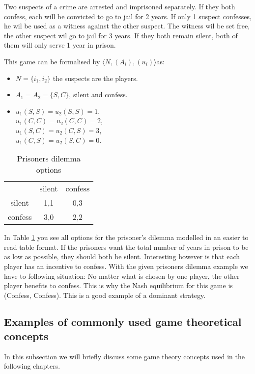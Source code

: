 Two suspects of a crime are arrested and imprisoned separately. If they both confess, each will be convicted to go to jail for 2 years. If only 1 suspect confesses, he wil be used as a witness against the other suspect. The witness wil be set free, the other suspect wil go to jail for 3 years. If they both remain silent, both of them will only serve 1 year in prison.

This game can be formalised by $\langle N, (A_i), (u_i) \rangle$as:
\begin{itemize}
	\item $N = \{i_{1}, i_{2} \}$ the suspects are the players.
    \item $A_1 = A_2 = \{S, C\}$, silent and confess.
    \item $u_1(S, S) = u_2(S, S) = 1$, \\
    $u_1(C, C) = u_2(C, C) = 2$, \\
    $u_1(S, C) = u_2(C, S) = 3$, \\
    $u_1(C, S) = u_2(S, C) = 0$.

\end{itemize}

\begin{table}[h]
\centering
\begin{tabular}{ccc}
                             & silent                   & confess                   \\ \cline{2-3} 
\multicolumn{1}{c|}{silent}  & \multicolumn{1}{c|}{1,1} & \multicolumn{1}{c|}{0,3} \\ \cline{2-3} 
\multicolumn{1}{c|}{confess} & \multicolumn{1}{c|}{3,0} & \multicolumn{1}{c|}{2,2} \\ \cline{2-3} 
\end{tabular}
\caption{Prisoners dilemma options}
\label{prisoners-d}
\end{table}

In Table \ref{prisoners-d} you see all options for the prisoner's dilemma modelled in an easier to read table format. If the prisoners want the total number of years in prison to be as low as possible, they should both be silent. Interesting however is that each player has an incentive to confess. With the given prisoners dilemma example we have to following situation: No matter what is chosen by one player, the other player benefits to confess. This is why the Nash equilibrium for this game is (Confess, Confess). This is a good example of a dominant strategy. 

\subsection{Examples of commonly used game theoretical concepts}
In this subsection we will briefly discuss some game theory concepts used in the following chapters. 

